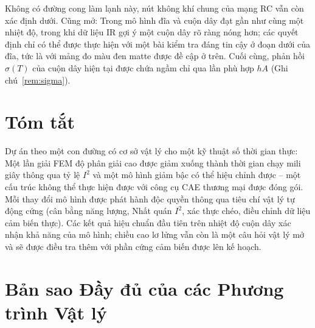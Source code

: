 \documentclass[a4paper, 10pt, conference]{ieeeconf}
\theoremstyle{remark}
\begin{document}
Không có đường cong làm lạnh này, nút không khí chung của mạng RC vẫn còn xác định
dưới. Cũng mở: Trong mô hình đĩa và cuộn dây đạt gần như cùng một nhiệt độ, trong
khi dữ liệu IR gợi ý một cuộn dây rõ ràng nóng hơn; các quyết định chỉ có thể được
thực hiện với một bài kiểm tra đáng tin cậy ở đoạn dưới của đĩa, tức là với mảng
đo màu đen matte được đề cập ở trên. Cuối cùng, phản hồi $\sigma(T)$ của cuộn dây
hiện tại được chứa ngầm chỉ qua lần phù hợp $hA$ (Ghi chú~\ref{rem:sigma}).


\section{Tóm tắt}
\label{sec:conclusion}

Dự án theo một con đường có cơ sở vật lý cho một kỹ thuật số thời gian thực: Một
lần giải FEM độ phân giải cao được giảm xuống thành thời gian chạy mili giây thông
qua tỷ lệ $I^2$ và một mô hình giảm bậc có thể hiệu chỉnh được -- một cấu trúc không
thể thực hiện được với công cụ CAE thương mại được đóng gói. Mỗi thay đổi mô hình
được phát hành độc quyền thông qua tiêu chí vật lý tự động cứng (cân bằng năng lượng,
Nhất quán $I^2$, xác thực chéo, điều chỉnh dữ liệu cảm biến thực). Các kết quả hiệu
chuẩn đầu tiên trên nhiệt độ cuộn dây xác nhận khả năng của mô hình; chiều cao lơ
lửng vẫn còn là một câu hỏi vật lý mở và sẽ được điều tra thêm với phần cứng cảm biến
được lên kế hoạch.


\appendices

\section{Bản sao Đầy đủ của các Phương trình Vật lý}
\label{app:derivation}
\end{document}
